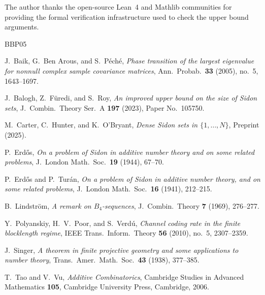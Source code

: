 \documentclass[12pt]{amsart}
\begin{document}
The author thanks the open-source Lean~4 and Mathlib communities for providing
the formal verification infrastructure used to check the upper bound
arguments.

\begin{thebibliography}{BBP05}

J.~Baik, G.~Ben Arous, and S.~P\'{e}ch\'{e},
\emph{Phase transition of the largest eigenvalue for nonnull complex sample covariance matrices},
Ann.\ Probab.\ \textbf{33} (2005), no.~5, 1643--1697.

J.~Balogh, Z.~F\"{u}redi, and S.~Roy,
\emph{An improved upper bound on the size of Sidon sets},
J.\ Combin.\ Theory Ser.~A \textbf{197} (2023), Paper No.~105750.

M.~Carter, C.~Hunter, and K.~O'Bryant,
\emph{Dense Sidon sets in $\{1,\ldots,N\}$},
Preprint (2025).

P.~Erd\H{o}s,
\emph{On a problem of Sidon in additive number theory and on some related problems},
J.\ London Math.\ Soc.\ \textbf{19} (1944), 67--70.

P.~Erd\H{o}s and P.~Tur\'{a}n,
\emph{On a problem of Sidon in additive number theory, and on some related problems},
J.\ London Math.\ Soc.\ \textbf{16} (1941), 212--215.

B.~Lindstr\"{o}m,
\emph{A remark on $B_4$-sequences},
J.\ Combin.\ Theory \textbf{7} (1969), 276--277.

Y.~Polyanskiy, H.~V.~Poor, and S.~Verd\'{u},
\emph{Channel coding rate in the finite blocklength regime},
IEEE Trans.\ Inform.\ Theory \textbf{56} (2010), no.~5, 2307--2359.

J.~Singer,
\emph{A theorem in finite projective geometry and some applications to number theory},
Trans.\ Amer.\ Math.\ Soc.\ \textbf{43} (1938), 377--385.

T.~Tao and V.~Vu,
\emph{Additive Combinatorics},
Cambridge Studies in Advanced Mathematics \textbf{105},
Cambridge University Press, Cambridge, 2006.

\end{thebibliography}
\end{document}
